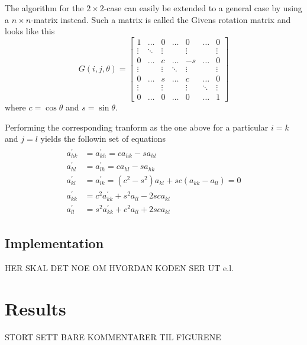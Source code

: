 \documentclass[10pt, a4paper]{amsart}
\begin{document}
The algorithm for the $2\times2$-case can easily be extended to a general case by using a $n\times n$-matrix instead. Such a matrix is called the Givens rotation matrix and looks like this
\begin{equation}
G(i,j,\theta) = \begin{bmatrix}
1 & \hdots & 0 &\hdots & 0 & \hdots & 0 \\
    \vdots & \ddots & \vdots & {} & \vdots & {} & \vdots \\
    0 & \hdots & c &\hdots & -s & \hdots & 0 \\
    \vdots & {} & \vdots & \ddots & \vdots & {} & \vdots \\
    0 & \hdots & s &\hdots & c & \hdots & 0 \\
    \vdots & {} & \vdots & {} & \vdots & \ddots & \vdots \\
0 & \hdots & 0 &\hdots & 0 & \hdots & 1
\end{bmatrix}
\end{equation}
where $c= \cos{\theta}$ and $s=\sin{\theta}$.

Performing the corresponding tranform as the one above for a particular $i=k$ and $j=l$ yields the followin set of equations
\begin{align}
\begin{split}
  a^{\prime}_{hk} &= a^{\prime}_{kh} = ca_{hk} - sa_{hl} \\
  a^{\prime}_{hl} &= a^{\prime}_{lh} = ca_{hl} - sa_{hk} \\
  a^{\prime}_{kl} &= a^{\prime}_{lk} = (c^2 - s^2)a_{kl} + sc(a_{kk} - a_{ll}) = 0\\
  a^{\prime}_{kk} &= c^2a^{\prime}_{kk} + s^2a_{ll} - 2sca_{kl}\\
  a^{\prime}_{ll} &= s^2a^{\prime}_{kk} + c^2a_{ll} + 2sca_{kl}
\end{split}
\end{align}

\subsection{Implementation}
HER SKAL DET NOE OM HVORDAN KODEN SER UT e.l.

\section{Results}
STORT SETT BARE KOMMENTARER TIL FIGURENE
\end{document}
